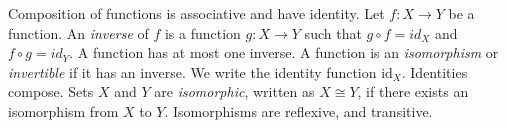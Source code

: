  Composition of functions is associative and have identity.
 Let $f \colon X \to Y$ be a function. An \textit{inverse} of $f$ is a function $g \colon X \to Y$ such that $g \circ f = id_X$ and $f \circ g = id_Y$.
 A function has at most one inverse.
 A function is an \textit{isomorphism} or \textit{invertible} if it has an inverse.
 We write the identity function $\text{id}_X$. Identities compose.
 Sets $X$ and $Y$ are \textit{isomorphic}, written as $X \cong Y$, if there exists an isomorphism from $X$ to $Y$.
 Isomorphisms are reflexive, and transitive.
